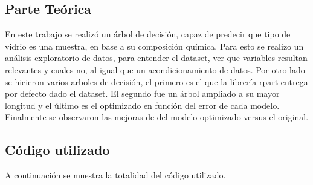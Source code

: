 \subsection{Parte Teórica}
En este trabajo se realizó un árbol de decisión, capaz de predecir que tipo de vidrio es una muestra, en base a su composición química. Para esto se realizo un análisis exploratorio de datos, para entender el dataset, ver que variables resultan relevantes y cuales no, al igual que un acondicionamiento de datos. Por otro lado se hicieron varios arboles de decisión, el primero es el que la librería rpart entrega por defecto dado el dataset. El segundo fue un árbol ampliado a su mayor longitud y el último es el optimizado en función del error de cada modelo. Finalmente se observaron las mejoras de del modelo optimizado versus el original.

\subsection{Código utilizado}
A continuación se muestra la totalidad del código utilizado.


%
